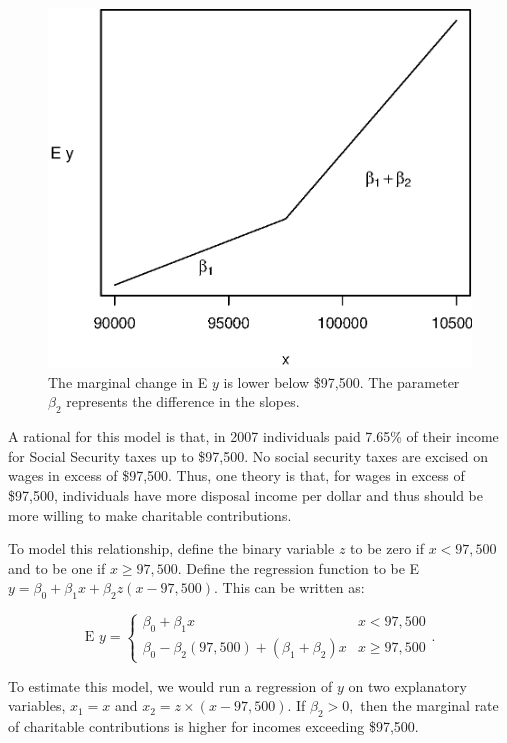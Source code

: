 \begin{figure}[htp]
  \begin{center}
    \includegraphics[width=.6\textwidth]{Chapter3/F3Charity.eps}
    \caption{\label{F3:Charity} \small The marginal change in E $y$ is
    lower below \$97,500. The parameter $\beta_2$ represents the
    difference in the slopes.}
  \end{center}
\end{figure}


A rational for this model is that, in 2007 individuals paid 7.65\%
of their income for Social Security taxes up to \$97,500. No social
security taxes are excised on wages in excess of \$97,500. Thus, one
theory is that, for wages in excess of \$97,500, individuals have
more disposal income per dollar and thus should be more willing to
make charitable contributions.

To model this relationship, define the binary variable $z$ to be
zero if $x < 97,500$ and to be one if $x \geq  97,500$. Define the
regression function to be E $y = \beta_0 + \beta_1 x + \beta_2 z (x
- 97,500).$ This can be written as:


\begin{equation*}
\textrm{E }y = \left\{ \begin{array}{ll}
        \beta_0 + \beta_1  x                    & x < 97,500 \\
        \beta_0 - \beta_2(97,500) + (\beta_1+\beta_2) x & x \geq  97,500
\end{array} . \right.
\end{equation*}

\noindent To estimate this model, we would run a regression of $y$
on two explanatory variables, $x_1 = x$ and $x_2 = z \times (x -
97,500)$. If $\beta_2 > 0,$ then the marginal rate of charitable
contributions is higher for incomes exceeding \$97,500.

